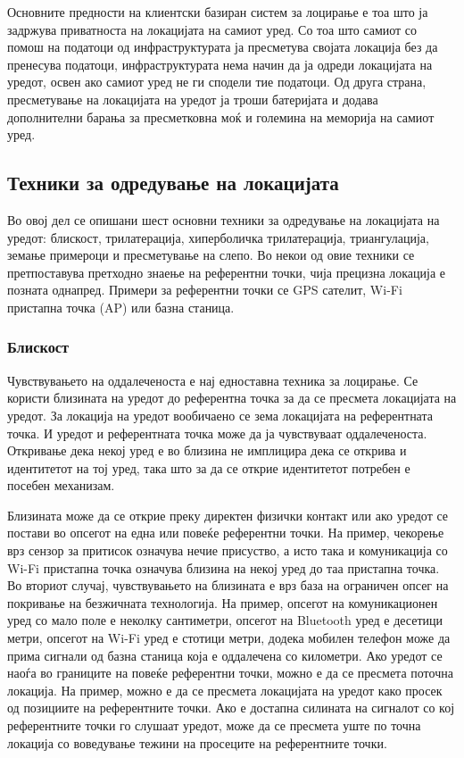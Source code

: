 Основните предности на клиентски
базиран систем за лоцирање е тоа што ја задржува приватноста на локацијата на
самиот уред. Со тоа што самиот со помош на податоци од инфраструктурата ја
пресметува својата локација без да пренесува податоци, инфраструктурата нема
начин да ја одреди локацијата на уредот, освен ако самиот уред не ги сподели тие
податоци. Од друга страна, пресметување на локацијата на уредот ја троши
батеријата и додава дополнителни барања за пресметковна моќ и големина на
меморија на самиот уред. 

\subsection{Техники за одредување на локацијата} 

Во овој дел се
опишани шест основни техники за одредување на локацијата на уредот: блискост,
трилатерација, хиперболичка трилатерација, триангулација, земање примероци и
пресметување на слепо. Во некои од овие техники се претпоставува претходно
знаење на референтни точки, чија прецизна локација е позната однапред. Примери
за референтни точки се GPS сателит, Wi-Fi пристапна точка (AP) или базна
станица.

\subsubsection{Блискост}  
 
 Чувствувањето на оддалеченоста е нај едноставна техника за
лоцирање. Се користи близината на уредот до референтна точка за да се пресмета
локацијата на уредот. За локација на уредот вообичаено се зема локацијата на
референтната точка. И уредот и референтната точка може да ја чувствуваат
оддалеченоста. Откривање дека некој уред е во близина не имплицира дека се
открива и идентитетот на тој уред, така што за да се открие идентитетот потребен
е посебен механизам. 

Близината може да се открие преку директен физички контакт
или ако уредот се постави во опсегот на една или повеќе референтни точки. На
пример, чекорење врз сензор за притисок означува нечие присуство, а исто така и
комуникација со Wi-Fi пристапна точка означува близина на некој уред до таа
пристапна точка. Во вториот случај, чувствувањето на близината е врз база на
ограничен опсег на покривање на безжичната технологија. На пример, опсегот на
комуникационен уред со мало поле е неколку сантиметри, опсегот на Bluetooth уред
е десетици метри, опсегот на Wi-Fi уред е стотици метри, додека мобилен телефон
може да прима сигнали од базна станица која е оддалечена со километри. Ако
уредот се наоѓа во границите на повеќе референтни точки, можно е да се пресмета
поточна локација. На пример, можно е да се пресмета локацијата на уредот како
просек од позициите на референтните точки. Ако е достапна силината на сигналот
со кој референтните точки го слушаат уредот, може да се пресмета уште по точна
локација со воведување тежини на просеците на референтните точки. 

